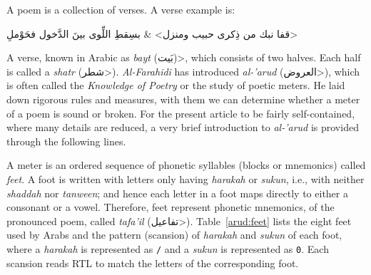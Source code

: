 \documentclass[journal,10pt,twocolumns,letter]{IEEEtran}
\begin{document}
A poem is a collection of verses. A verse example is:

\begin{traditionalpoem*}
\<قفا نبك من ذِكرى حبيب ومنزل>
\quad & \quad
\<بسِقطِ اللِّوى بينَ الدَّخول فحَوْملِ>
\end{traditionalpoem*}

A verse, known in Arabic as \textit{bayt} \<(بَيت)>, which consists of two halves. Each
half is called a \textit{shatr} (\<شطر>).  \textit{Al-Farahidi} has introduced
\textit{al-'arud} (\<العروض>), which is often called the \textit{Knowledge of Poetry} or
the study of poetic meters. He laid down rigorous rules and measures, with them we can determine
whether a meter of a poem is sound or broken. For the present article to be fairly self-contained,
where many details are reduced, a very brief introduction to \textit{al-'arud} is provided through
the following lines.
\begin{table}[!tb]
  \centering
  \caption{The eight feet of Arabic poetry. Every digit (\texttt{/} or \texttt{0}) represents the
    corresponding diacritic over a letter of a feet: \textit{harakah} (\mbox{\<◌َ>
      \<◌ُ> \<◌ِ>}) or \textit{sukun} (\<◌ْ>) respectively. Any of the
    three letters \mbox{\<و ا ى>} (called \textit{mad}) is equivalent to \texttt{0};
    \textit{tanween} and \textit{shaddah} are equivalent to \texttt{0/} and \texttt{/0}
    respectively.}\label{arud:feet}
\end{table}

A meter is an ordered sequence of phonetic syllables (blocks or mnemonics) called \textit{feet}. A
foot is written with letters only having \textit{harakah} or \textit{sukun}, i.e., with neither
\textit{shaddah} nor \textit{tanween}; and hence each letter in a foot maps directly to either a
consonant or a vowel. Therefore, feet represent phonetic mnemonics, of the pronounced
poem, called \textit{tafa'il} (\<تفاعيل>). Table~\ref{arud:feet} lists the eight feet used
by Arabs and the pattern (scansion) of \textit{harakah} and \textit{sukun} of each foot, where a
\textit{harakah} is represented as \texttt{/} and a \textit{sukun} is represented as
\texttt{0}. Each scansion reads RTL to match the letters of the corresponding foot.
\end{document}
